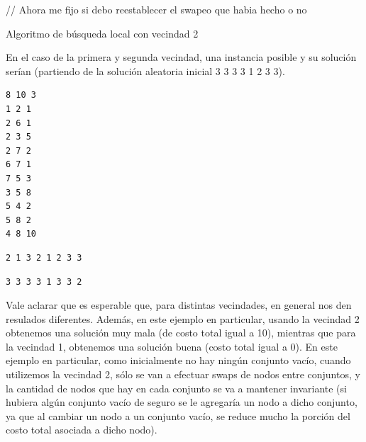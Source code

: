 \documentclass[11pt, a4paper, twoside]{article}
\begin{document}
\begin{enumerate}
\begin{enumerate}
\begin{enumerate}
\begin{algorithm}
{{							// Ahora me fijo si debo reestablecer el swapeo que habia hecho o no \\
						}
					}
					  
					\caption{Algoritmo de búsqueda local con vecindad 2}
					\end{algorithm}
				  
		\end{enumerate}
		
		En el caso de la primera  y segunda vecindad, una instancia posible y su solución serían (partiendo de la solución 
		aleatoria inicial 3 3 3 3 1 2 3 3). \\

		
\begin{minipage}[t]{0.4\textwidth}
\begin{Verbatim}[frame=single,framesep=1cm,label= Ejemplo de entrada]
8 10 3
1 2 1
2 6 1
2 3 5
2 7 2
6 7 1
7 5 3
3 5 8
5 4 2
5 8 2
4 8 10
\end{Verbatim}
\end{minipage}
\hfill
\begin{minipage}[t]{0.4\textwidth}
\begin{Verbatim}[frame=single,framesep=1cm,label= Ejemplo de salida: vecindad 1]
2 1 3 2 1 2 3 3
\end{Verbatim}
\hfill
\begin{Verbatim}[frame=single,framesep=1cm,label= Ejemplo de salida: vecindad 2]
3 3 3 3 1 3 3 2
\end{Verbatim}
\end{minipage}
		
		Vale aclarar que es esperable que, para distintas vecindades, en general nos den resulados diferentes. Además, en este ejemplo
		en particular, usando la vecindad 2 obtenemos una solución muy mala (de costo total igual a 10), mientras que para la vecindad 1,
		obtenemos una solución buena (costo total igual a 0). En este ejemplo en particular, como inicialmente no hay ningún conjunto vacío,
		cuando utilizemos la vecindad 2, sólo se van a efectuar swaps de nodos entre conjuntos, y la cantidad de nodos que hay en cada conjunto
		se va a mantener invariante (si hubiera algún conjunto vacío de seguro se le agregaría un nodo a dicho conjunto, ya que al cambiar un nodo
		a un conjunto vacío, se reduce mucho la porción del costo total asociada a dicho nodo). \\
		

\end{enumerate}
\end{enumerate}
\end{document}
